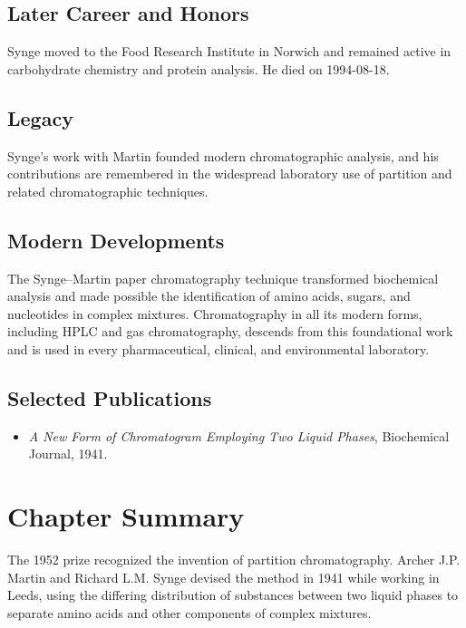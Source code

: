 \subsection*{Later Career and Honors}

Synge moved to the Food Research Institute in Norwich and remained active in carbohydrate chemistry and protein analysis. He died on 1994-08-18.

\subsection*{Legacy}

Synge's work with Martin founded modern chromatographic analysis, and his contributions are remembered in the widespread laboratory use of partition and related chromatographic techniques.

\subsection*{Modern Developments}

The Synge–Martin paper chromatography technique transformed biochemical analysis and made possible the identification of amino acids, sugars, and nucleotides in complex mixtures. Chromatography in all its modern forms, including HPLC and gas chromatography, descends from this foundational work and is used in every pharmaceutical, clinical, and environmental laboratory.

\subsection*{Selected Publications}

\begin{itemize}

\item \emph{A New Form of Chromatogram Employing Two Liquid Phases}, Biochemical Journal, 1941.

\end{itemize}

\clearpage

\section*{Chapter Summary}

The 1952 prize recognized the invention of partition chromatography. Archer J.P. Martin and Richard L.M. Synge devised the method in 1941 while working in Leeds, using the differing distribution of substances between two liquid phases to separate amino acids and other components of complex mixtures.

